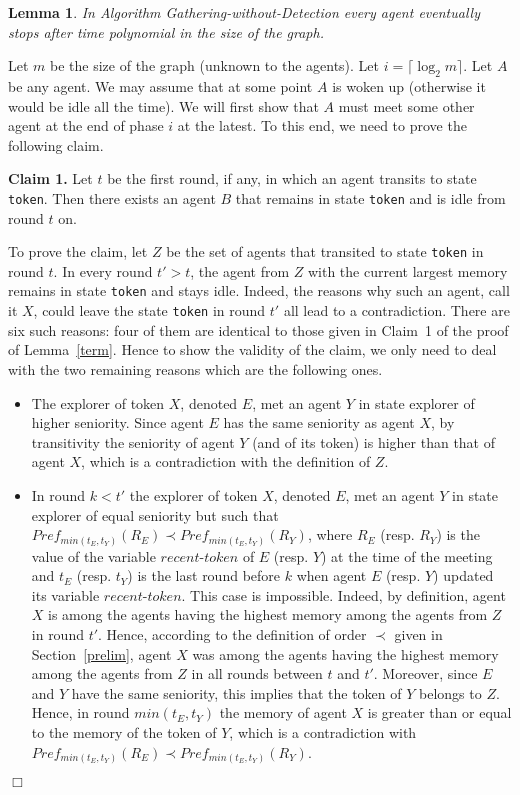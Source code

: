 \documentclass[11pt]{article}
\newtheorem{lemma}{Lemma}[section]
\newcommand{\qed}{\hfill $\Box$ \bigbreak}
\newenvironment{proof}{\noindent {\bf Proof.}}{\qed}
\begin{document}
\begin{lemma}\label{term2}
In Algorithm Gathering-without-Detection every agent eventually stops after time polynomial in the size of the graph.
\end{lemma}

\begin{proof}
Let $m$ be the size of the graph (unknown to the agents). Let {$i=\lceil \log_2 m \rceil$}. Let $A$ be any agent. 
We may assume that at some point $A$ is woken up (otherwise it would be idle all the time).
{We will first show that $A$ must meet some other agent at the end of phase $i$ at the latest. To this end, we need to prove the following claim.}

\noindent
{{\bf Claim 1.} Let $t$ be the first round, if any, in which an agent transits to state {\tt token}. Then there exists an agent $B$ that remains in state {\tt token} and is idle from round $t$ on. }

{To prove the claim, let $Z$ be the set of agents that transited to state {\tt token} in round $t$. In every round $t'>t$, the agent from $Z$ with the current largest memory remains in state {\tt token} and stays idle. Indeed, the reasons why such an agent, call it $X$, could leave the state {\tt token} in round $t'$ all lead to a contradiction. There are six such reasons: four of them are identical to those given in Claim~1 of the proof of Lemma~\ref{term}. Hence to show the validity of the claim, we only need to deal with the two remaining reasons which are the following ones.}
\begin{itemize}

\item{ The explorer of token $X$, denoted $E$, met an agent $Y$ in state explorer of higher seniority. Since agent $E$ has the same seniority as agent $X$, by transitivity the seniority of agent $Y$ (and of its token) is higher than that of agent $X$, which is a contradiction with the definition of $Z$.}

\item{ In round $k<t'$ the explorer of token $X$, denoted $E$, met an agent $Y$ in state explorer of equal seniority but such that $Pref_{min(t_E,t_Y)}(R_E) \prec Pref_{min(t_E,t_Y)}(R_Y)$, where $R_E$ (resp. $R_Y$) is the value of the variable $recent$-$token$ of $E$ (resp. $Y$) at the time of the meeting and $t_E$ (resp. $t_Y$) is the last round before $k$ when agent $E$ (resp. $Y$) updated its variable $recent$-$token$. This case is impossible. Indeed, by definition, agent $X$ is among the agents having the highest memory among the agents from $Z$ in round $t'$. Hence, according to the definition of order $\prec$ given in Section~\ref{prelim}, agent $X$ was among the agents having the highest memory among the agents from $Z$ in all rounds between $t$ and $t'$. Moreover, since $E$ and $Y$ have the same seniority, this implies that the token of $Y$ belongs to $Z$. Hence, in round $min(t_E,t_Y)$ the memory of agent $X$ is greater than or equal to the memory of the token of $Y$, which is a contradiction with $Pref_{min(t_E,t_Y)}(R_E) \prec Pref_{min(t_E,t_Y)}(R_Y)$.}


\end{itemize}
\end{proof}
\end{document}

